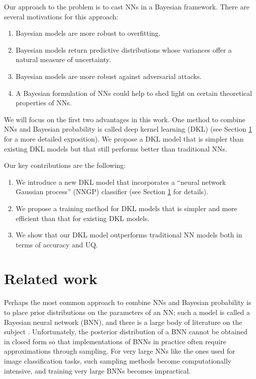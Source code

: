 \documentclass{article}
\begin{document}
Our approach to the problem is to cast NNs in a Bayesian framework. There are several motivations for this approach:
\begin{enumerate}
\item Bayesian models are more robust to overfitting.
\item Bayesian models return predictive distributions whose variances offer a natural measure of uncertainty.
\item Bayesian models are more robust against adversarial attacks.
\item A Bayesian formulation of NNs could help to shed light on certain theoretical properties of NNs.
\end{enumerate}
We will focus on the first two advantages in this work. One method to combine NNs and Bayesian probability is called deep kernel learning (DKL) (see Section \ref{section-rw} for a more detailed exposition). We propose a DKL model that is simpler than existing DKL models but that still performs better than traditional NNs.

Our key contributions are the following:
\begin{enumerate}
\item We introduce a new DKL model that incorporates a ``neural network Gaussian process'' (NNGP) classifier (see Section \ref{section-rw} for details).
\item We propose a training method for DKL models that is simpler and more efficient than that for existing DKL models.
\item We show that our DKL model outperforms traditional NN models both in terms of accuracy and UQ.
\end{enumerate}

\section{Related work}
\label{section-rw}

Perhaps the most common approach to combine NNs and Bayesian probability is to place prior distributions on the parameters of an NN; such a model is called a Bayesian neural network (BNN), and there is a large body of literature on the subject \cite{neal2012bayesian}. Unfortunately, the posterior distribution of a BNN cannot be obtained in closed form so that implementations of BNNs in practice often require approximations through sampling. For very large NNs like the ones used for image classification tasks, such sampling methods become computationally intensive, and training very large BNNs becomes impractical.
\end{document}
